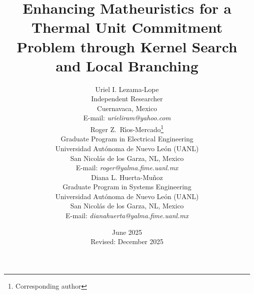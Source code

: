 \documentclass[letterpaper,titlepage,11pt]{article}
\title{Enhancing Matheuristics for a Thermal Unit Commitment Problem through Kernel Search and Local Branching}
\author{%
{Uriel I. Lezama-Lope}\\%
Independent Researcher\\
Cuernavaca, Mexico\\%
E-mail: \textit{urieliram@yahoo.com}\\[1em]
%
{Roger Z.\ R\'{\i}os-Mercado}\thanks{Corresponding author}\\%
Graduate Program in Electrical Engineering\\%
Universidad Aut\'onoma de Nuevo Le\'on (UANL)\\%
San Nicol\'as de los Garza, NL, Mexico\\%
E-mail: \textit{roger@yalma.fime.uanl.mx}\\[1em]
{Diana L. Huerta-Mu{\~n}oz}\\%
Graduate Program in Systems Engineering\\%
Universidad Aut\'onoma de Nuevo Le\'on (UANL)\\%
San Nicol\'as de los Garza, NL, Mexico\\%
E-mail: \textit{dianahuerta@yalma.fime.uanl.mx}\\
}
\date{June 2025\\Revised: December 2025}
\begin{document}
\maketitle

\linenumbers

\begin{abstract}




\end{abstract}
\end{document}
